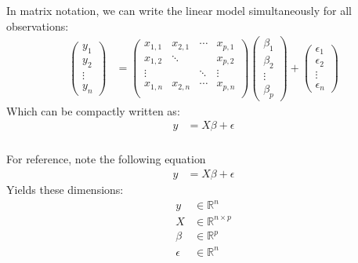 \documentclass[xetex,mathserif,serif,aspectratio=169]{beamer}
\begin{document}
\begin{frame}[fragile] \frametitle{} \oldB \small

In matrix notation, we can write the linear model simultaneously
for all observations:
\begin{align*}
\left(\begin{array}{c}y_1\\ y_2\\ \vdots\\ y_n\end{array}\right) &=
  \left(\begin{array}{cccc}x_{1,1}&x_{2,1}&\cdots&x_{p,1}\\
                           x_{1,2}&\ddots&&x_{p,2}\\
                           \vdots&&\ddots&\vdots\\
                           x_{1,n}&x_{2,n}&\cdots&x_{p,n}\\\end{array}\right)
  \left(\begin{array}{c}\beta_1\\ \beta_2\\ \vdots\\ \beta_p\end{array}\right) +
  \left(\begin{array}{c}\epsilon_1\\ \epsilon_2\\ \vdots\\ \epsilon_n\end{array}\right)
\end{align*}
\pause Which can be compactly written as:
\begin{align*}
y &= X \beta + \epsilon
\end{align*}

\end{frame}

\begin{frame}[fragile] \frametitle{} \oldB \small

For reference, note the following equation
\begin{align*}
y &= X \beta + \epsilon
\end{align*}
Yields these dimensions:
\begin{align*}
y &\in \mathbb{R}^n \\
X &\in \mathbb{R}^{n \times p} \\
\beta &\in \mathbb{R}^p \\
\epsilon &\in \mathbb{R}^n \\
\end{align*}

\end{frame}
\end{document}
